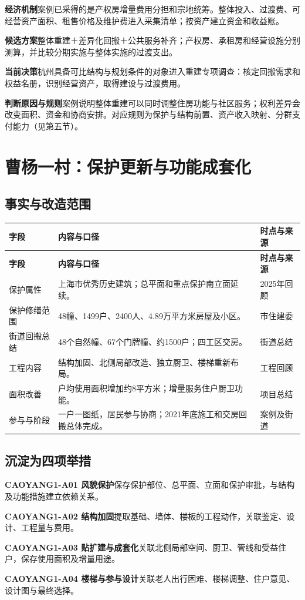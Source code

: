 \documentclass[UTF8,11pt,fontset=windows]{ctexart}
\newcommand{\field}[2]{\par\noindent\textbf{#1}\quad #2\par}
\begin{document}
\field{经济机制}{案例已采得的是产权房增量费用分担和宗地统筹。整体投入、过渡费、可经营资产面积、租售价格及维护费进入采集清单；按资产建立资金和收益账。}
\field{候选方案}{整体重建＋差异化回搬＋公共服务补齐；产权房、承租房和经营设施分别测算，并比较分期实施与整体实施的过渡支出。}
\field{当前决策}{杭州具备可比结构与规划条件的对象进入重建专项调查：核定回搬需求和权益名册，识别经营资产，取得建设与过渡费用。}
\field{判断原因与规则}{案例说明整体重建可以同时调整住房功能与社区服务；权利差异会改变面积、资金和协商安排。对应规则为保护与结构前置、资产收入映射、分群支付能力（见第五节）。}

\clearpage
\section{曹杨一村：保护更新与功能成套化}

\subsection{事实与改造范围}

\begin{longtable}{@{}L{40mm}L{85mm}L{34mm}@{}}
\toprule\textbf{字段} & \textbf{内容与口径} & \textbf{时点与来源}\\\midrule
\endfirsthead
\toprule\textbf{字段} & \textbf{内容与口径} & \textbf{时点与来源}\\\midrule
\endhead
保护属性 & 上海市优秀历史建筑；总平面和重点保护南立面延续。 & 2025年回顾\cite{S03}\\
保护修缮范围 & 48幢、1499户、2400人、4.89万平方米房屋及小区。 & 市住建委\cite{S03}\\
街道回搬总结 & 48个自然幢、67个门牌幢、约1500户；四工区交房。 & 街道总结\cite{S05}\\
工程内容 & 结构加固、北侧局部改造、独立厨卫、楼梯重新布局。 & 工程回顾\cite{S03}\\
面积改善 & 户均使用面积增加约8平方米；增量服务住户厨卫功能。 & 项目总结\cite{S03,S04}\\
参与与阶段 & 一户一图纸，居民参与协商；2021年底施工和交房回搬总体完成。 & 案例及街道\cite{S04,S05}\\
\bottomrule
\end{longtable}

\subsection{沉淀为四项举措}

\field{CAOYANG1-A01 风貌保护}{保存保护部位、总平面、立面和保护审批，与结构及功能措施建立依赖关系。}
\field{CAOYANG1-A02 结构加固}{提取基础、墙体、楼板的工程动作，关联鉴定、设计、工程量与费用。}
\field{CAOYANG1-A03 贴扩建与成套化}{关联北侧局部空间、厨卫、管线和受益住户，保存使用面积及增量用途。}
\field{CAOYANG1-A04 楼梯与参与设计}{关联老人出行困难、楼梯调整、住户意见、设计图与最终选择。}
\end{document}
